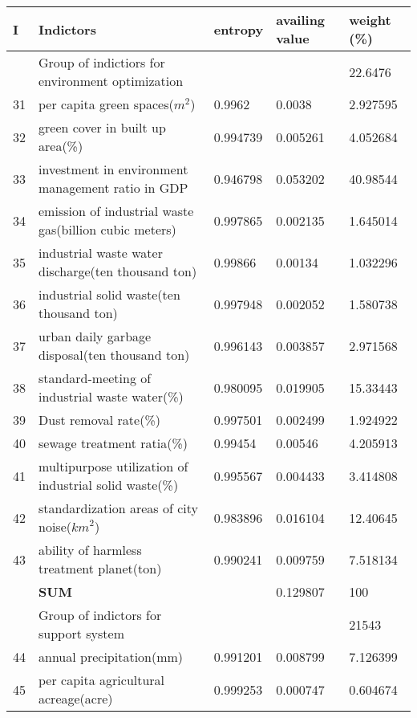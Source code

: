 \documentclass{mcmthesis}
\begin{document}
\begin{table}
\setlength{\abovecaptionskip}{0pt}
\setlength{\belowcaptionskip}{0pt}
\centering
\begin{tabular}{p{0.4cm}|p{8cm}|p{1.5cm}|p{1.5cm}|p{1.7cm}}
\hline
\bf I	& \bf Indictors			 &  \bf entropy		& \bf availing value		& \bf weight (\%) \\	
\hline
\rowcolor[gray]{0.9}	& Group of indictiors for environment optimization			& 		& 		& 22.6476 \\	
\hline
31		& per capita green spaces($m^2$)		& 0.9962		& 0.0038		& 2.927595 \\	
32		& green cover in built up area(\%)		& 0.994739		& 0.005261		& 4.052684 \\	
33		& investment in environment management ratio in GDP		& 0.946798		& 0.053202		& 40.98544 \\	
34		&  emission of industrial waste gas(billion cubic meters)		& 0.997865		& 0.002135		& 1.645014 \\	
35		& industrial waste water discharge(ten thousand ton)		& 0.99866		& 0.00134		& 1.032296 \\	
36		& industrial solid waste(ten thousand ton)		& 0.997948		& 0.002052		& 1.580738 \\	
37		& urban daily garbage disposal(ten thousand ton)		& 0.996143		& 0.003857		& 2.971568 \\	
38		& standard-meeting of industrial waste water(\%)		& 0.980095		& 0.019905		& 15.33443 \\	
39		& Dust removal rate(\%)		& 0.997501		& 0.002499		& 1.924922 \\	
40		& sewage treatment ratia(\%)		& 0.99454		& 0.00546		& 4.205913 \\	
41		& multipurpose utilization of industrial solid waste(\%)		& 0.995567		& 0.004433		& 3.414808 \\	
42		& standardization areas of city noise(${km}^2$)		& 0.983896		& 0.016104		& 12.40645 \\	
43		& ability of harmless treatment planet(ton)		& 0.990241		& 0.009759		& 7.518134 \\	
	&\bf  SUM			& 		& 0.129807		& 100 \\	
\hline
\rowcolor[gray]{0.9}	& Group of indictors for support  system			& 		& 		& 21543 \\	
\hline
44		& annual precipitation(mm)		& 0.991201		& 0.008799		& 7.126399 \\	
45		& per capita agricultural acreage(acre)		& 0.999253		& 0.000747		& 0.604674 \\	

\end{tabular}
\end{table}
\end{document}
